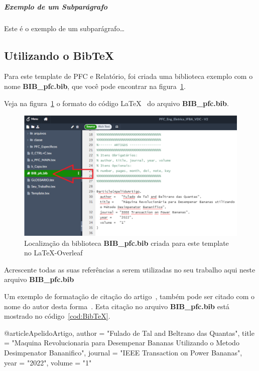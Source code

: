 \subparagraph{Exemplo de um Subparágrafo}
Este é o exemplo de um subparágrafo\ldots



\subsection{Utilizando o BibTeX}
\label{sec:BibTeX}

Para este template de PFC e Relatório, foi criada uma biblioteca exemplo com o nome {\bf BIB\_pfc.bib}, que você pode encontrar na figura~\ref{fig:bib_pfc}. 

Veja na figura~\ref{fig:bib_pfc} o formato do código \LaTeX~ do arquivo {\bf BIB\_pfc.bib}.

\begin{figure}[htb]
    \centering  
    \includegraphics[width=15cm]{classe/arqcls/Fig_bib_pfc.pdf}
    \caption{Localização da biblioteca  {\bf BIB\_pfc.bib} criada para este template no LaTeX-Overleaf}    
    \label{fig:bib_pfc}
\end{figure}

\vspace{6mm}
\begin{CaixaVerde}
    Acrescente todas as suas referências a serem utilizadas no seu trabalho aqui neste arquivo {\bf BIB\_pfc.bib}
\end{CaixaVerde}

\vspace{6mm}
Um exemplo de formatação de citação do artigo~\cite{ApelidoArtigo}, também pode ser citado com o nome do autor desta forma~. Esta citação no arquivo {\bf BIB\_pfc.bib} está mostrado no código~\ref{cod:BibTeX}.  

\pagebreak
\begin{Codigo}[language=tex, 
    caption=Exemplo de alimentação do arquivo {BIB\_pfc.bib}, 
    label=cod:BibTeX]
  @article{ApelidoArtigo,
  author =   "Fulado de Tal and Beltrano das Quantas",
  title =    "Maquina Revolucionaria para Desempenar Bananas 
              Utilizando o Metodo Desimpenator Bananifico",
  journal = "IEEE Transaction on Power Bananas", 
  year =    "2022",
  volume =  "1"
}
\end{Codigo}


